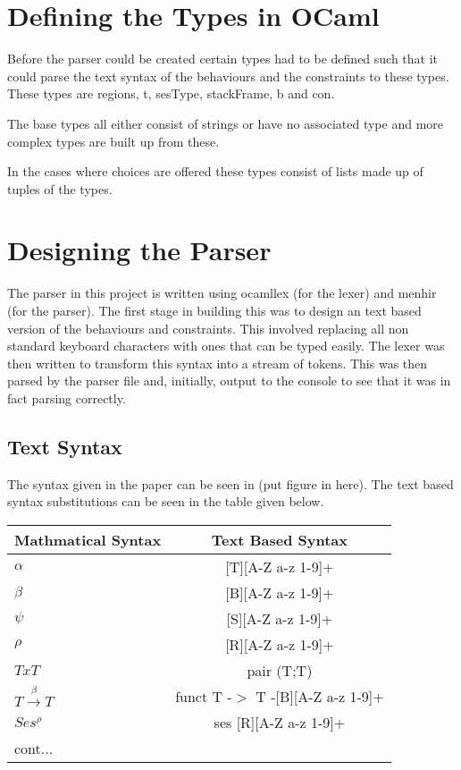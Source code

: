 \documentclass[12pt]{article}
\begin{document}
\maketitle

\section{Defining the Types in OCaml}

Before the parser could be created certain types had to be defined such that it could parse the text syntax of the behaviours and the constraints to these types. These types are regions, t, sesType, stackFrame, b and con. 

The base types all either consist of strings or have no associated type and more complex types are built up from these. 

In the cases where choices are offered these types consist of lists made up of tuples of the types. 

\section {Designing the Parser}

The parser in this project is written using ocamllex (for the lexer) and menhir (for the parser). The first stage in building this was to design an text based version of the behaviours and constraints. This involved replacing all non standard keyboard characters with ones that can be typed easily. The lexer was then written to transform this syntax into a stream of tokens. This was then parsed by the parser file and, initially, output to the console to see that it was in fact parsing correctly. 

\subsection{Text Syntax}

The syntax given in the paper can be seen in (put figure in here). The text based syntax substitutions can be seen in the table given below. 

\begin{tabular}{l c }
Mathmatical Syntax & Text Based Syntax \\
\hline
$\alpha$ & [T][A-Z a-z 1-9]+ \\
$\beta$ & [B][A-Z a-z 1-9]+ \\
$\psi$ & [S][A-Z a-z 1-9]+ \\
$\rho$ & [R][A-Z a-z 1-9]+ \\
$T x T$ & pair (T;T) \\
$ T\overset{\beta}{\rightarrow}T $ & funct T -$>$ T -[B][A-Z a-z 1-9]+ \\
$Ses^\rho$ & ses [R][A-Z a-z 1-9]+ \\
cont...

\end{tabular}
\end{document}
